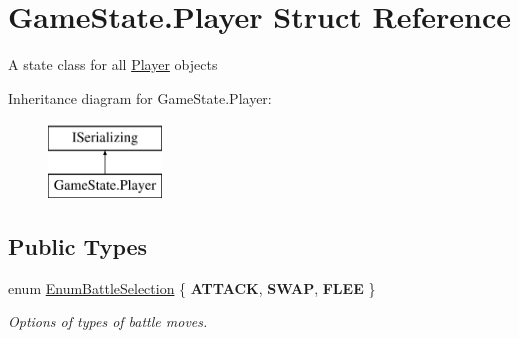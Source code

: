 \hypertarget{class_game_state_1_1_player}{\section{Game\-State.\-Player Struct Reference}
\label{class_game_state_1_1_player}
}


A state class for all \hyperlink{class_game_state_1_1_player}{Player} objects  


Inheritance diagram for Game\-State.\-Player\-:\begin{figure}[H]
\begin{center}
\leavevmode
\includegraphics[height=2.000000cm]{class_game_state_1_1_player}
\end{center}
\end{figure}
\subsection*{Public Types}
\begin{DoxyCompactItemize}
\item 
enum \hyperlink{class_game_state_1_1_player_a9f54c5eca1e60acbaa2074e981f51615}{Enum\-Battle\-Selection} \{ {\bfseries A\-T\-T\-A\-C\-K}, 
{\bfseries S\-W\-A\-P}, 
{\bfseries F\-L\-E\-E}
 \}
\begin{DoxyCompactList}\small\item\em Options of types of battle moves. \end{DoxyCompactList}\end{DoxyCompactItemize}
